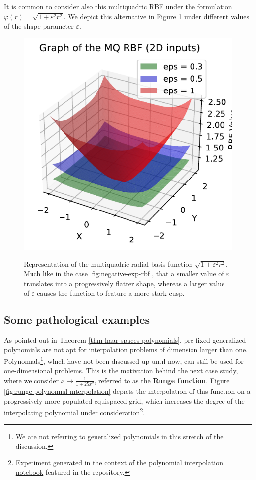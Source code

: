 \documentclass[12pt]{report} %
\newcommand{\tmstrong}[1]{\textbf{#1}}
\begin{document}
It is common to consider also this multiquadric RBF under the formulation
$\varphi (r) = \sqrt{1 + \varepsilon^2 r^2}$. We depict this alternative in
Figure \ref{fig:mq-rbf} under different values of the shape parameter
$\varepsilon$.

\begin{figure}[ht]
    \centering
    {\includegraphics[width=.5\textwidth, clip=true, trim={0 0 .17cm 0}]{imagenes/rbf_discussion/mq-rbf.pdf}}
    \caption{Representation of the multiquadric radial basis function $\sqrt{1+\varepsilon^2 r^2}$. Much like in the case \ref{fig:negative-exp-rbf}, that a smaller value of $\varepsilon$ translates into a progressively flatter shape, whereas a larger value of $\varepsilon$ causes the function to feature a more stark cusp.}
    \label{fig:mq-rbf}
\end{figure}

\subsection*{Some pathological examples}

As pointed out in Theorem \ref{thm-haar-spaces-polynomials}, pre-fixed
generalized polynomials are not apt for interpolation problems of
dimension larger than one. Polynomials\footnote{We are not referring to generalized polynomials in this stretch of the discussion.}, which
have not been discussed up until now, can still be used for one-dimensional
problems. This is the motivation behind the next case study, where we consider
$x \mapsto \frac{1}{1 + 25 x^2}$, referred to as the {\tmstrong{Runge
function}}. Figure \ref{fig:runge-polynomial-interpolation} depicts the
interpolation of this function on a progressively more populated equispaced
grid, which increases the degree of the interpolating polynomial under consideration\footnote{Experiment generated in the context of the \href{https://github.com/heqro/tfm-experiments/blob/main/introductory_notebooks/polynomial_interpolation/runge.ipynb}{polynomial interpolation notebook} featured in the repository.}. 
\end{document}
